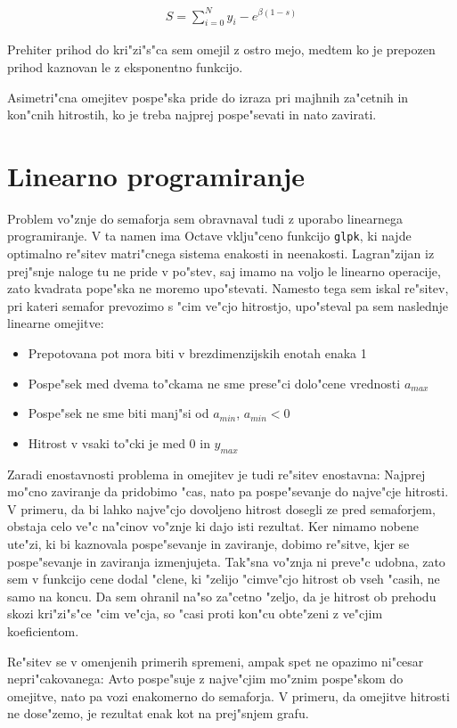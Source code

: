 \documentclass[a4paper,10pt]{article}
\begin{document}
\begin{align}
 S = \sum_{i=0}^{N} y_i - e^{\beta (1-s)}
\end{align}

Prehiter prihod do kri"zi"s"ca sem omejil z ostro mejo, medtem ko je prepozen prihod kaznovan le z eksponentno funkcijo. 



Asimetri"cna omejitev pospe"ska pride do izraza pri majhnih za"cetnih in kon"cnih hitrostih, ko je treba najprej pospe"sevati in nato zavirati. 

\section{Linearno programiranje}

Problem vo"znje do semaforja sem obravnaval tudi z uporabo linearnega programiranje. V ta namen ima Octave vklju"ceno funkcijo \texttt{glpk}, ki najde optimalno re"sitev matri"cnega sistema enakosti in neenakosti. Lagran"zijan iz prej"snje naloge tu ne pride v po"stev, saj imamo na voljo le linearno operacije, zato kvadrata pope"ska ne moremo upo"stevati. Namesto tega sem iskal re"sitev, pri kateri semafor prevozimo s "cim ve"cjo hitrostjo, upo"steval pa sem naslednje linearne omejitve:

\begin{itemize}
  \item Prepotovana pot mora biti v brezdimenzijskih enotah enaka 1
  \item Pospe"sek med dvema to"ckama ne sme prese"ci dolo"cene vrednosti $a_{max}$
  \item Pospe"sek ne sme biti manj"si od $a_{min}$, $a_{min} < 0$
  \item Hitrost v vsaki to"cki je med 0 in $y_{max}$
\end{itemize}



Zaradi enostavnosti problema in omejitev je tudi re"sitev enostavna: Najprej mo"cno zaviranje da pridobimo "cas, nato pa pospe"sevanje do najve"cje hitrosti. V primeru, da bi lahko najve"cjo dovoljeno hitrost dosegli ze pred semaforjem, obstaja celo ve"c na"cinov vo"znje ki dajo isti rezultat. Ker nimamo nobene ute"zi, ki bi kaznovala pospe"sevanje in zaviranje, dobimo re"sitve, kjer se pospe"sevanje in zaviranja izmenjujeta. Tak"sna vo"znja ni preve"c udobna, zato sem v funkcijo cene dodal "clene, ki "zelijo "cimve"cjo hitrost ob vseh "casih, ne samo na koncu. Da sem ohranil na"so za"cetno "zeljo, da je hitrost ob prehodu skozi kri"zi"s"ce "cim ve"cja, so "casi proti kon"cu obte"zeni z ve"cjim koeficientom. 



Re"sitev se v omenjenih primerih spremeni, ampak spet ne opazimo ni"cesar nepri"cakovanega: Avto pospe"suje z najve"cjim mo"znim pospe"skom do omejitve, nato pa vozi enakomerno do semaforja. V primeru, da omejitve hitrosti ne dose"zemo, je rezultat enak kot na prej"snjem grafu. 
\end{document}
